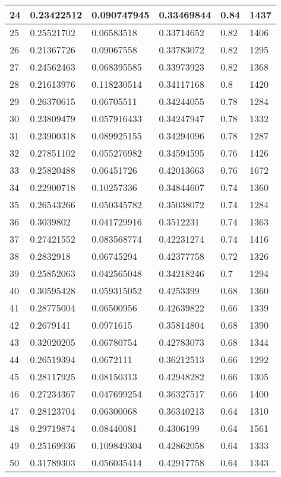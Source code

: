 \begin{longtable}{|l|l|l|l|l|l|}
24 & 0.23422512 & 0.090747945 & 0.33469844 & 0.84 & 1437 \\ \hline 
25 & 0.25521702 & 0.06583518 & 0.33714652 & 0.82 & 1406 \\ \hline 
26 & 0.21367726 & 0.09067558 & 0.33783072 & 0.82 & 1295 \\ \hline 
27 & 0.24562463 & 0.068395585 & 0.33973923 & 0.82 & 1368 \\ \hline 
28 & 0.21613976 & 0.118230514 & 0.34117168 & 0.8 & 1420 \\ \hline 
29 & 0.26370615 & 0.06705511 & 0.34244055 & 0.78 & 1284 \\ \hline 
30 & 0.23809479 & 0.057916433 & 0.34247947 & 0.78 & 1332 \\ \hline 
31 & 0.23900318 & 0.089925155 & 0.34294096 & 0.78 & 1287 \\ \hline 
32 & 0.27851102 & 0.055276982 & 0.34594595 & 0.76 & 1426 \\ \hline 
33 & 0.25820488 & 0.06451726 & 0.42013663 & 0.76 & 1672 \\ \hline 
34 & 0.22900718 & 0.10257336 & 0.34844607 & 0.74 & 1360 \\ \hline 
35 & 0.26543266 & 0.050345782 & 0.35038072 & 0.74 & 1284 \\ \hline 
36 & 0.3039802 & 0.041729916 & 0.3512231 & 0.74 & 1363 \\ \hline 
37 & 0.27421552 & 0.083568774 & 0.42231274 & 0.74 & 1416 \\ \hline 
38 & 0.2832918 & 0.06745294 & 0.42377758 & 0.72 & 1326 \\ \hline 
39 & 0.25852063 & 0.042565048 & 0.34218246 & 0.7 & 1294 \\ \hline 
40 & 0.30595428 & 0.059315052 & 0.4253399 & 0.68 & 1360 \\ \hline 
41 & 0.28775004 & 0.06500956 & 0.42639822 & 0.66 & 1339 \\ \hline 
42 & 0.2679141 & 0.0971615 & 0.35814804 & 0.68 & 1390 \\ \hline 
43 & 0.32020205 & 0.06780754 & 0.42783073 & 0.68 & 1344 \\ \hline 
44 & 0.26519394 & 0.0672111 & 0.36212513 & 0.66 & 1292 \\ \hline 
45 & 0.28117925 & 0.08150313 & 0.42948282 & 0.66 & 1305 \\ \hline 
46 & 0.27234367 & 0.047699254 & 0.36327517 & 0.66 & 1400 \\ \hline 
47 & 0.28123704 & 0.06300068 & 0.36340213 & 0.64 & 1310 \\ \hline 
48 & 0.29719874 & 0.08440081 & 0.4306199 & 0.64 & 1561 \\ \hline 
49 & 0.25169936 & 0.109849304 & 0.42862058 & 0.64 & 1333 \\ \hline 
50 & 0.31789303 & 0.056035414 & 0.42917758 & 0.64 & 1343 \\ \hline 
\end{longtable}
